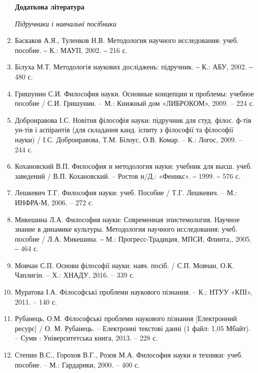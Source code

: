 \begin{enumerate}
\begin{center}
\textbf{Додаткова література}\par
\textit{Підручники і навчальні посібники}\par
\end{center}

\item Баскаков А.Я., Туленков Н.В. Методология научного исследования:
учеб. пособие. ‒ К.: МАУП, 2002. ‒ 216 с.

\item Білуха М.Т. Методологія наукових досліджень: підручник. ‒ К.: АБУ,
2002. ‒ 480 с.

\item Гришунин С.И. Философия науки. Основные концепции и проблемы:
учебное пособие / С.И. Гришунин. – М.: Книжный дом «ЛИБРОКОМ», 2009. –
224 с.

\item Добронравова І.С. Новітня філософія науки: підручник для студ. філос.
ф-тів ун-тів і аспірантів (для складання канд. іспиту з філософії та філософії
науки) / І.С. Добронравова, Т.М. Білоус, О.В. Комар. – К.: Логос, 2009. – 244 с.

\item Кохановский В.П. Философия и методология науки: учебник для высш.
учеб. заведений / В.П. Кохановский. – Ростов н/Д.: «Феникс». ‒ 1999. ‒ 576 с.

\item Лешкевич Т.Г. Философия науки: учеб. Пособие / Т.Г. Лешкевич. – М.:
ИНФРА-М, 2006. – 272 с.

\item Микешина Л.А. Философия науки: Современная эпистемология.
Научное знание в динамике культуры. Методология научного исследования:
учеб. пособие / Л.А. Микешина. ‒ М.: Прогресс-Традиция, МПСИ, Флинта,,
2005. ‒ 464 с.

\item Мовчан С.П. Основи філософії науки: навч. посіб. / С.П. Мовчан, О.К.
Чаплигін. – Х.: ХНАДУ, 2016. – 339 с.

\item Муратова І.А. Філософські проблеми наукового пізнання. – К.: НТУУ
«КПІ», 2011. – 140 с.

\item Рубанець, О.М. Філософські проблеми наукового пізнання [Електронний
ресурс] / О. М. Рубанець. – Електронні текстові данні (1 файл: 1,05 Мбайт). –
Суми : Університетська книга, 2013. – 228 с.

\item Степин В.С., Горохов В.Г., Розов М.А. Философия науки и техники:
учеб. пособие. – М.: Гардарики, 2000. – 400 с.


\end{enumerate}
